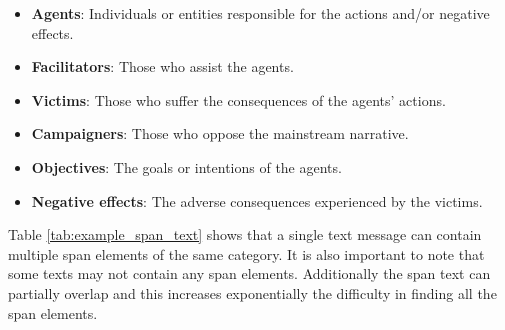 \documentclass{Configuration_Files/PoliMi3i_thesis}
\begin{document}
\begin{itemize}
    \item \textbf{Agents}: Individuals or entities responsible for the actions and/or negative effects.
    \item \textbf{Facilitators}: Those who assist the agents.
    \item \textbf{Victims}: Those who suffer the consequences of the agents' actions.
    \item \textbf{Campaigners}: Those who oppose the mainstream narrative.
    \item \textbf{Objectives}: The goals or intentions of the agents.
    \item \textbf{Negative effects}: The adverse consequences experienced by the victims.
\end{itemize}

Table \ref{tab:example_span_text} shows that a single text message can contain multiple span elements of the same category. It is also important to note that some texts may not contain any span elements. Additionally the span text can partially overlap and this increases exponentially the difficulty in finding all the span elements.
\end{document}

